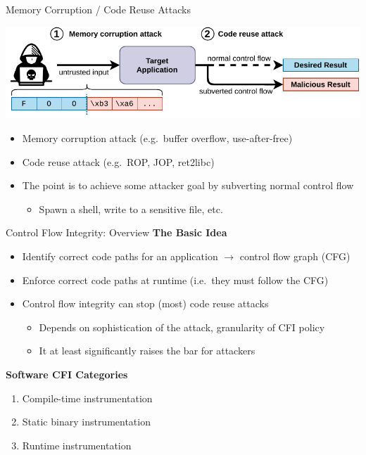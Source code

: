 \documentclass[12pt, dvipsnames, aspectratio=169]{beamer}
\begin{document}
\begin{frame}[c]{Memory Corruption / Code Reuse Attacks}{}
\begin{center}
  \color{black}%
  \includegraphics[width=0.8\columnwidth]{figs/memory_corruption.pdf}
\end{center}

\vfill
\begin{itemize}
  \item Memory corruption attack (e.g.~buffer overflow, use-after-free)
  \item Code reuse attack (e.g.~ROP, JOP, ret2libc)
  \item The point is to achieve some attacker goal by subverting normal control flow
  \begin{itemize}
    \item Spawn a shell, write to a sensitive file, etc.
  \end{itemize}
\end{itemize}
\end{frame}

\begin{frame}[c]{Control Flow Integrity: Overview}{}
{\bf The Basic Idea}
\begin{itemize}
  \item Identify correct code paths for an application $\rightarrow$ control flow graph (CFG)
  \item Enforce correct code paths at runtime (i.e.~they must follow the CFG)
  \item Control flow integrity can stop (most) code reuse attacks
  \begin{itemize}
    \item Depends on sophistication of the attack, granularity of CFI policy
    \item It at least significantly raises the bar for attackers
  \end{itemize}
\end{itemize}

\vfill
{\bf Software CFI Categories}
\begin{enumerate}
  \item Compile-time instrumentation
  \item Static binary instrumentation
  \item Runtime instrumentation
\end{enumerate}
\end{frame}
\end{document}
